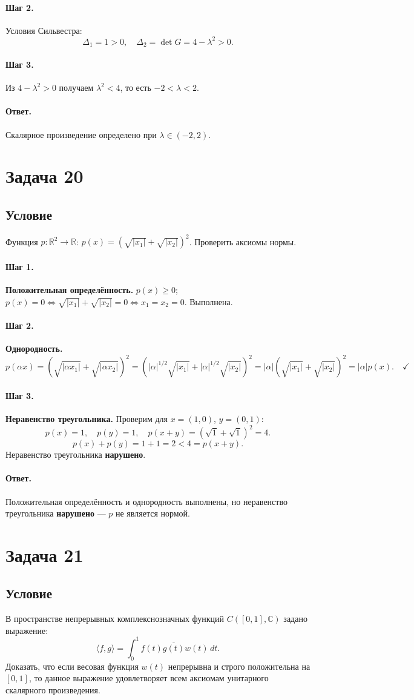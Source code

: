 \documentclass[12pt,a4paper]{article}
\theoremstyle{solution}
\newcommand{\task}[1]{\newpage\section*{Задача #1}}
\newcommand{\answer}{\paragraph{Ответ.}}
\newcommand{\step}[1]{\paragraph{Шаг #1.}}
\newcommand{\R}{\mathbb{R}}
\newcommand{\C}{\mathbb{C}}
\begin{document}
\step{2} Условия Сильвестра:
\[
\Delta_1=1>0,\quad\Delta_2=\det G=4-\lambda^2>0.
\]

\step{3} Из $4-\lambda^2>0$ получаем $\lambda^2<4$, то есть $-2<\lambda<2$.

\answer Скалярное произведение определено при $\lambda\in(-2,2)$.

\task{20}
\subsection*{Условие}
Функция $p:\R^2\to\R$: $p(x)=(\sqrt{|x_1|}+\sqrt{|x_2|})^2$. Проверить аксиомы нормы.

\step{1} \textbf{Положительная определённость.} $p(x)\geq0$; $p(x)=0\Leftrightarrow\sqrt{|x_1|}+\sqrt{|x_2|}=0\Leftrightarrow x_1=x_2=0$. Выполнена.

\step{2} \textbf{Однородность.}
\[
p(\alpha x)=(\sqrt{|\alpha x_1|}+\sqrt{|\alpha x_2|})^2=(|\alpha|^{1/2}\sqrt{|x_1|}+|\alpha|^{1/2}\sqrt{|x_2|})^2
=|\alpha|(\sqrt{|x_1|}+\sqrt{|x_2|})^2=|\alpha|p(x).\quad\checkmark
\]

\step{3} \textbf{Неравенство треугольника.} Проверим для $x=(1,0)$, $y=(0,1)$:
\[
p(x)=1,\quad p(y)=1,\quad
p(x+y)=(\sqrt{1}+\sqrt{1})^2=4.
\]
\[
p(x)+p(y)=1+1=2<4=p(x+y).
\]
Неравенство треугольника \textbf{нарушено}.

\answer Положительная определённость и однородность выполнены, но неравенство треугольника \textbf{нарушено} --- $p$ не является нормой.

\task{21}
\subsection*{Условие}
В пространстве непрерывных комплекснозначных функций $C([0, 1], \C)$ задано выражение:
\[
\langle f, g\rangle = \int_0^1 f(t)\overline{g(t)}w(t)\,dt.
\]
Доказать, что если весовая функция $w(t)$ непрерывна и строго положительна на $[0, 1]$, то данное выражение удовлетворяет всем аксиомам унитарного скалярного произведения.
\end{document}
